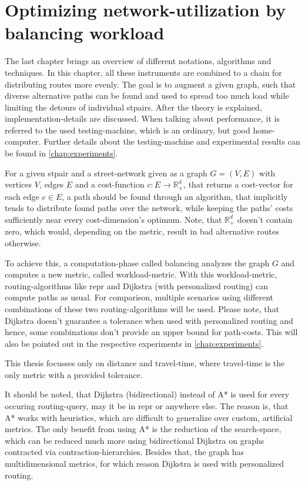 \chapter{Optimizing network-utilization by balancing workload}
\label{chap:balancing}

The last chapter brings an overview of different notations, algorithms and techniques.
In this chapter, all these instruments are combined to a chain for distributing routes more evenly.
The goal is to augment a given graph, such that diverse alternative paths can be found and used to spread too much load while limiting the detours of individual \glspl{stpair}.
After the theory is explained, implementation-details are discussed.
When talking about performance, it is referred to the used testing-machine, which is an ordinary, but good home-computer.
Further details about the testing-machine and experimental results can be found in \vref{chap:experiments}.

For a given \gls{stpair} and a street-network given as a graph $G = (V, E)$ with vertices $V$, edges $E$ and a cost-function $c: E \to \mathbb{R}_+^d$, that returns a cost-vector for each edge $e \in E$, a path should be found through an algorithm, that implicitly tends to distribute found paths over the network, while keeping the paths' costs sufficiently near every cost-dimension's optimum.
Note, that $\mathbb{R}_+^d$ doesn't contain zero, which would, depending on the metric, result in bad alternative routes otherwise.

To achieve this, a computation-phase called balancing analyzes the graph $G$ and computes a new metric, called workload-metric.
With this workload-metric, routing-algorithms like \gls{repr} and Dijkstra (with personalized routing) can compute paths as usual.
For comparison, multiple scenarios using different combinations of these two routing-algorithms will be used.
Please note, that Dijkstra doesn't guarantee a tolerance when used with personalized routing and hence, some combinations don't provide an upper bound for path-costs.
This will also be pointed out in the respective experiments in \cref{chap:experiments}.

This thesis focusses only on distance and travel-time, where travel-time is the only metric with a provided tolerance.

It should be noted, that Dijkstra (bidirectional) instead of A* is used for every occuring routing-query, may it be in \gls{repr} or anywhere else.
The reason is, that A* works with heuristics, which are difficult to generalize over custom, artificial metrics.
The only benefit from using A* is the reduction of the search-space, which can be reduced much more using bidirectional Dijkstra on graphs contracted via contraction-hierarchies.
Besides that, the graph has multidimensional metrics, for which reason Dijkstra is used with personalized routing.


